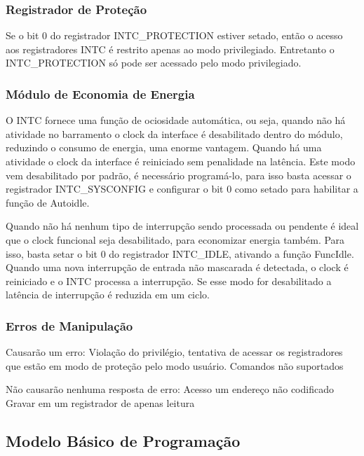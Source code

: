 \documentclass[12pt]{article}
\begin{document}
			\subsubsection{Registrador de Proteção}
				Se o bit 0 do registrador INTC\_PROTECTION estiver setado, então o acesso aos registradores INTC é restrito apenas ao modo privilegiado. Entretanto o INTC\_PROTECTION só pode ser acessado pelo modo privilegiado.
			\subsubsection{Módulo de Economia de Energia}
				O INTC fornece uma função de ociosidade automática, ou seja, quando não há atividade no barramento o clock da interface é desabilitado dentro do módulo, reduzindo o consumo de energia, uma enorme vantagem. Quando há uma atividade o clock da interface é reiniciado sem penalidade na latência. Este modo vem desabilitado por padrão, é necessário programá-lo, para isso basta acessar o registrador INTC\_SYSCONFIG e configurar o bit 0 como setado para habilitar a função de Autoidle.\
				
				Quando não há nenhum tipo de interrupção sendo processada ou pendente é ideal que o clock funcional seja desabilitado, para economizar energia também. Para isso, basta setar o bit 0 do registrador INTC\_IDLE, ativando a função FuncIdle. Quando uma nova interrupção de entrada não mascarada é detectada, o clock é reiniciado e o INTC processa a interrupção. Se esse modo for desabilitado a latência de interrupção é reduzida em um ciclo.
			\subsubsection{Erros de Manipulação}
				Causarão um erro:
				  	\subitem Violação do privilégio, tentativa de acessar os registradores que estão em modo de proteção pelo modo usuário.
				  	\subitem Comandos não suportados \
				  
				Não causarão nenhuma resposta de erro: 
					\subitem Acesso um endereço não codificado 
					\subitem Gravar em um registrador de apenas leitura \
		\subsection{Modelo Básico de Programação}
\end{document}
